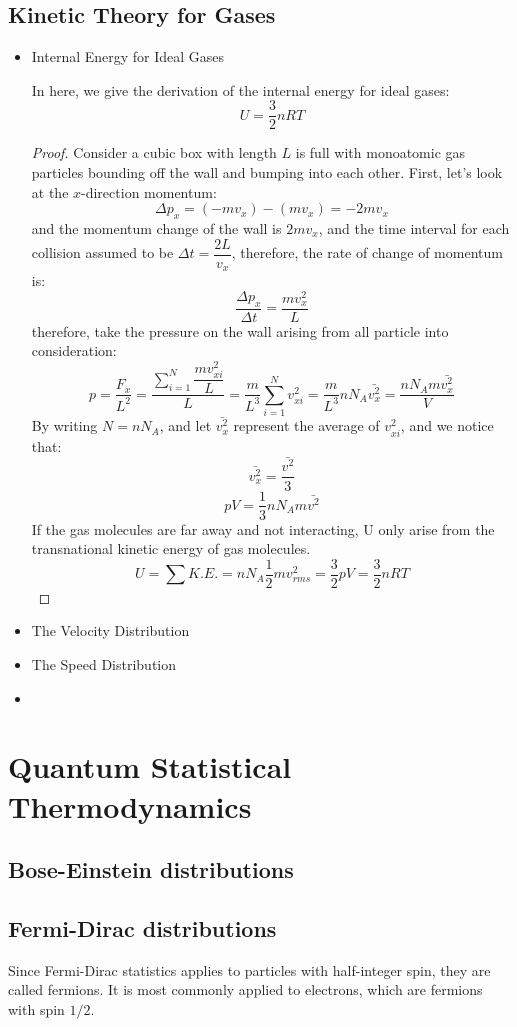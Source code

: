 \documentclass[UTF8]{book}
\begin{document}
\subsection{Kinetic Theory for Gases}
\begin{itemize}
\item Internal Energy for Ideal Gases

 {In here, we give the derivation of the internal energy for ideal gases: }
$$U=\dfrac{3}{2}nRT$$
\begin{proof}
 {Consider a cubic box with length $L$ is full with monoatomic gas particles bounding off the wall and bumping into each other. First, let's look at the $x$-direction momentum:}
$$\Delta p_x=(-mv_x)-(mv_x)=-2mv_x$$
 {and the momentum change of the wall is $2mv_x$, and the time interval for each collision assumed to be $\Delta t=\dfrac{2L}{v_x}$, therefore, the rate of change of momentum is:}
$$\dfrac{\Delta p_x}{\Delta t}=\dfrac{mv_x^2}{L}$$
 {therefore, take the pressure on the wall arising from all particle into consideration:}
$$p=\dfrac{F_x}{L^2}=\dfrac{\sum_{i=1}^{N}\dfrac{mv_{xi}^2}{L}}{L}=\dfrac{m}{L^3}\sum_{i=1}^{N}v_{xi}^2=\dfrac{m}{L^3}nN_A\bar{v_x^2}=\dfrac{nN_Am\bar{v_x^2}}{V}$$
 {By writing $N=nN_A$, and let $\bar{v_x^2}$ represent the average of $v_{xi}^2$, and we notice that:}
$$\bar{v_x^2}=\dfrac{\bar{v^2}}{3}$$
$$pV=\dfrac{1}{3}nN_Am\bar{v^2}$$
 {If the gas molecules are far away and not interacting, U only arise from the transnational kinetic energy of gas molecules.}
$$U=\sum K.E.=nN_A\dfrac{1}{2}mv_{rms}^2=\dfrac{3}{2}pV=\dfrac{3}{2}nRT$$
\end{proof}
\item  {The Velocity Distribution}

\item  {The Speed Distribution}
\item 
\end{itemize}

\section{Quantum Statistical Thermodynamics}
\subsection{Bose-Einstein distributions}

\subsection{Fermi-Dirac distributions}
Since Fermi-Dirac statistics applies to particles with half-integer spin, they
are called fermions. It is most commonly applied to electrons,
which are fermions with spin $1/2$.
\newpage
\end{document}
